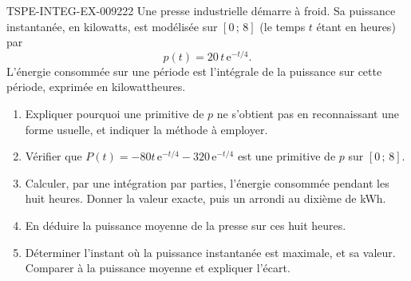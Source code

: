 \begin{exercice}{TSPE-INTEG-EX-009}{2}{22}
Une presse industrielle démarre à froid. Sa puissance instantanée, en kilowatts,
est modélisée sur $[0\,;\,8]$ (le temps $t$ étant en heures) par
\[
  p(t)=20\,t\,\mathrm{e}^{-t/4}.
\]
L'énergie consommée sur une période est l'intégrale de la puissance sur cette
période, exprimée en kilowattheures.
\begin{enumerate}
  \item Expliquer pourquoi une primitive de $p$ ne s'obtient pas en reconnaissant
    une forme usuelle, et indiquer la méthode à employer.
  \item Vérifier que $P(t)=-80t\,\mathrm{e}^{-t/4}-320\,\mathrm{e}^{-t/4}$ est une
    primitive de $p$ sur $[0\,;\,8]$.
  \item Calculer, par une intégration par parties, l'énergie consommée pendant
    les huit heures. Donner la valeur exacte, puis un arrondi au dixième de kWh.
  \item En déduire la puissance moyenne de la presse sur ces huit heures.
  \item Déterminer l'instant où la puissance instantanée est maximale, et sa
    valeur. Comparer à la puissance moyenne et expliquer l'écart.
\end{enumerate}
\end{exercice}
